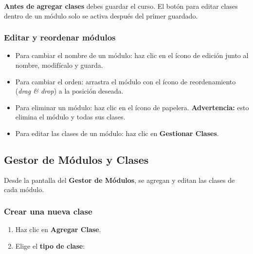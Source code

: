 \documentclass[a4paper,11pt]{article}
\begin{document}
\begin{warnbox}
\textbf{Antes de agregar clases} debes guardar el curso. El bot\'on para editar
clases dentro de un m\'odulo solo se activa despu\'es del primer guardado.
\end{warnbox}

\subsubsection{Editar y reordenar m\'odulos}

\begin{itemize}
  \item Para cambiar el nombre de un m\'odulo: haz clic en el \'icono de edici\'on
        junto al nombre, modif\'icalo y guarda.
  \item Para cambiar el orden: arrastra el m\'odulo con el \'icono de reordenamiento
        (\emph{drag \& drop}) a la posici\'on deseada.
  \item Para eliminar un m\'odulo: haz clic en el \'icono de papelera.
        \textbf{Advertencia:} esto elimina el m\'odulo y todas sus clases.
  \item Para editar las clases de un m\'odulo: haz clic en \textbf{Gestionar Clases}.
\end{itemize}

\subsection{Gestor de M\'odulos y Clases}

Desde la pantalla del \textbf{Gestor de M\'odulos}, se agregan y editan las clases
de cada m\'odulo.

\subsubsection{Crear una nueva clase}

\begin{enumerate}
  \item Haz clic en \textbf{Agregar Clase}.
  \item Elige el \textbf{tipo de clase}:
\end{enumerate}
\end{document}
